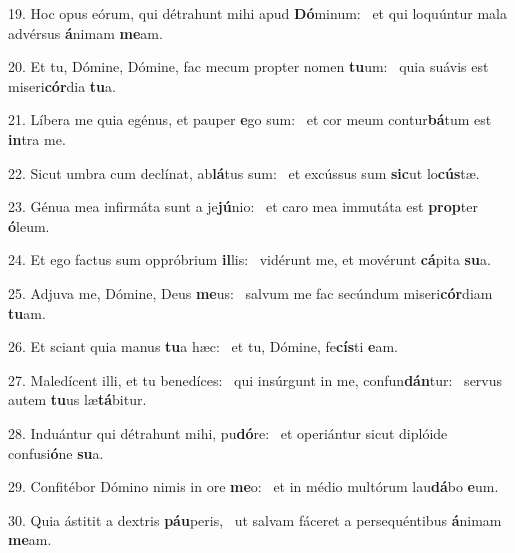 19. Hoc opus eórum, qui détrahunt mihi apud \textbf{Dó}minum: \ast\  et qui loquúntur mala advérsus \textbf{á}nimam \textbf{me}am.\

20. Et tu, Dómine, Dómine, fac mecum propter nomen \textbf{tu}um: \ast\  quia suávis est miseri\textbf{cór}dia \textbf{tu}a.\

21. Líbera me quia egénus, et pauper \textbf{e}go sum: \ast\  et cor meum contur\textbf{bá}tum est \textbf{in}tra me.\

22. Sicut umbra cum declínat, ab\textbf{lá}tus sum: \ast\  et excússus sum \textbf{sic}ut lo\textbf{cús}tæ.\

23. Génua mea infirmáta sunt a je\textbf{jú}nio: \ast\  et caro mea immutáta est \textbf{prop}ter \textbf{ó}leum.\

24. Et ego factus sum oppróbrium \textbf{il}lis: \ast\  vidérunt me, et movérunt \textbf{cá}pita \textbf{su}a.\

25. Adjuva me, Dómine, Deus \textbf{me}us: \ast\  salvum me fac secúndum miseri\textbf{cór}diam \textbf{tu}am.\

26. Et sciant quia manus \textbf{tu}a hæc: \ast\  et tu, Dómine, fe\textbf{cís}ti \textbf{e}am.\

27. Maledícent illi, et tu benedíces: \dag\  qui insúrgunt in me, confun\textbf{dán}tur: \ast\  servus autem \textbf{tu}us læ\textbf{tá}bitur.\

28. Induántur qui détrahunt mihi, pu\textbf{dó}re: \ast\  et operiántur sicut diplóide confusi\textbf{ó}ne \textbf{su}a.\

29. Confitébor Dómino nimis in ore \textbf{me}o: \ast\  et in médio multórum lau\textbf{dá}bo \textbf{e}um.\

30. Quia ástitit a dextris \textbf{páu}peris, \ast\  ut salvam fáceret a persequéntibus \textbf{á}nimam \textbf{me}am.\

